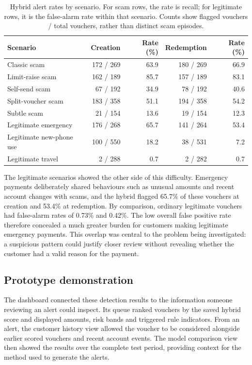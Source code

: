 \documentclass[a4paper,12pt]{article}
\begin{document}
\begin{table}[htbp]
\centering\small
\caption{Hybrid alert rates by scenario. For scam rows, the rate is recall; for legitimate rows, it is the false-alarm rate within that scenario. Counts show flagged vouchers / total vouchers, rather than distinct scam episodes.}
\begin{tabularx}{\linewidth}{Yrrrr}
\toprule
\textbf{Scenario} & \textbf{Creation} & \textbf{Rate (\%)} & \textbf{Redemption} & \textbf{Rate (\%)} \\
\midrule
Classic scam & 172 / 269 & 63.9 & 180 / 269 & 66.9 \\
Limit-raise scam & 162 / 189 & 85.7 & 157 / 189 & 83.1 \\
Self-send scam & 67 / 192 & 34.9 & 78 / 192 & 40.6 \\
Split-voucher scam & 183 / 358 & 51.1 & 194 / 358 & 54.2 \\
Subtle scam & 21 / 154 & 13.6 & 19 / 154 & 12.3 \\
Legitimate emergency & 176 / 268 & 65.7 & 141 / 264 & 53.4 \\
Legitimate new-phone use & 100 / 550 & 18.2 & 38 / 531 & 7.2 \\
Legitimate travel & 2 / 288 & 0.7 & 2 / 282 & 0.7 \\
\bottomrule
\end{tabularx}
\end{table}

The legitimate scenarios showed the other side of this difficulty. Emergency payments deliberately shared behaviours such as unusual amounts and recent account changes with scams, and the hybrid flagged 65.7\% of these vouchers at creation and 53.4\% at redemption. By comparison, ordinary legitimate vouchers had false-alarm rates of 0.73\% and 0.42\%. The low overall false positive rate therefore concealed a much greater burden for customers making legitimate emergency payments. This overlap was central to the problem being investigated: a suspicious pattern could justify closer review without revealing whether the customer had a valid reason for the payment.

\FloatBarrier\subsection{Prototype demonstration}

The dashboard connected these detection results to the information someone reviewing an alert could inspect. Its queue ranked vouchers by the saved hybrid score and displayed amounts, risk bands and triggered rule indicators. From an alert, the customer history view allowed the voucher to be considered alongside earlier scored vouchers and recent account events. The model comparison view then showed the results over the complete test period, providing context for the method used to generate the alerts.
\end{document}
